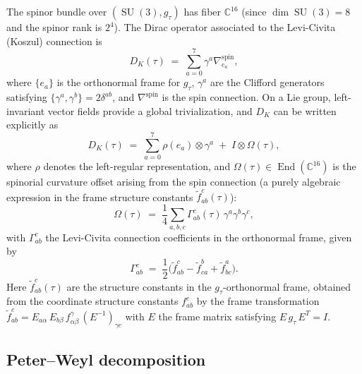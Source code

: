 \documentclass[12pt]{article}
\theoremstyle{definition}
\theoremstyle{remark}
\DeclareMathOperator{\SU}{SU}
\DeclareMathOperator{\End}{End}
\begin{document}
The spinor bundle over $(\SU(3), g_\tau)$ has fiber $\mathbb{C}^{16}$
(since $\dim\SU(3) = 8$ and the spinor rank is $2^4$).
The Dirac operator associated to the Levi-Civita (Koszul) connection
is
\begin{equation}\label{eq:dirac-operator}
  D_K(\tau) \;=\; \sum_{a=0}^{7} \gamma^a \nabla_{e_a}^{\mathrm{spin}},
\end{equation}
where $\{e_a\}$ is the orthonormal frame for $g_\tau$, $\gamma^a$ are
the Clifford generators satisfying $\{\gamma^a, \gamma^b\} = 2\delta^{ab}$,
and $\nabla^{\mathrm{spin}}$ is the spin connection.  On a Lie group,
left-invariant vector fields provide a global trivialization, and
$D_K$ can be written explicitly as
\begin{equation}\label{eq:dirac-explicit}
  D_K(\tau) \;=\; \sum_{a=0}^{7} \rho(e_a) \otimes \gamma^a
  \;+\; I \otimes \Omega(\tau),
\end{equation}
where $\rho$ denotes the left-regular representation, and
$\Omega(\tau) \in \End(\mathbb{C}^{16})$ is the spinorial curvature
offset arising from the spin connection (a purely algebraic expression
in the frame structure constants $\tilde{f}^c_{ab}(\tau)$):
\begin{equation}\label{eq:omega-offset}
  \Omega(\tau) \;=\; \frac{1}{4}\sum_{a,b,c}
  \Gamma^c_{ab}(\tau)\, \gamma^a \gamma^b \gamma^c,
\end{equation}
with $\Gamma^c_{ab}$ the Levi-Civita connection coefficients in the
orthonormal frame, given by
\begin{equation}\label{eq:connection-ON}
  \Gamma^c_{ab} \;=\; \frac{1}{2}\bigl(
  \tilde{f}^c_{ab} - \tilde{f}^b_{ca} + \tilde{f}^a_{bc}\bigr).
\end{equation}
Here $\tilde{f}^c_{ab}(\tau)$ are the structure constants in the
$g_\tau$-orthonormal frame, obtained from the coordinate structure
constants $f^c_{ab}$ by the frame transformation
$\tilde{f}^c_{ab} = E_{a\alpha}\, E_{b\beta}\, f^\gamma_{\alpha\beta}\,
(E^{-1})_{\gamma c}$
with $E$ the frame matrix satisfying $E\, g_\tau\, E^T = I$.


\subsection{Peter--Weyl decomposition}\label{subsec:peter-weyl}
\end{document}
